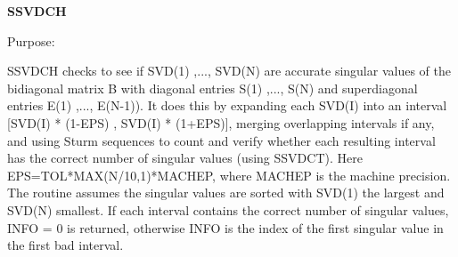 {\bfseries S\+S\+V\+D\+C\+H} 

\begin{DoxyParagraph}{Purpose\+: }
\begin{DoxyVerb} SSVDCH checks to see if SVD(1) ,..., SVD(N) are accurate singular
 values of the bidiagonal matrix B with diagonal entries
 S(1) ,..., S(N) and superdiagonal entries E(1) ,..., E(N-1)).
 It does this by expanding each SVD(I) into an interval
 [SVD(I) * (1-EPS) , SVD(I) * (1+EPS)], merging overlapping intervals
 if any, and using Sturm sequences to count and verify whether each
 resulting interval has the correct number of singular values (using
 SSVDCT). Here EPS=TOL*MAX(N/10,1)*MACHEP, where MACHEP is the
 machine precision. The routine assumes the singular values are sorted
 with SVD(1) the largest and SVD(N) smallest.  If each interval
 contains the correct number of singular values, INFO = 0 is returned,
 otherwise INFO is the index of the first singular value in the first
 bad interval.\end{DoxyVerb}
 
\end{DoxyParagraph}

